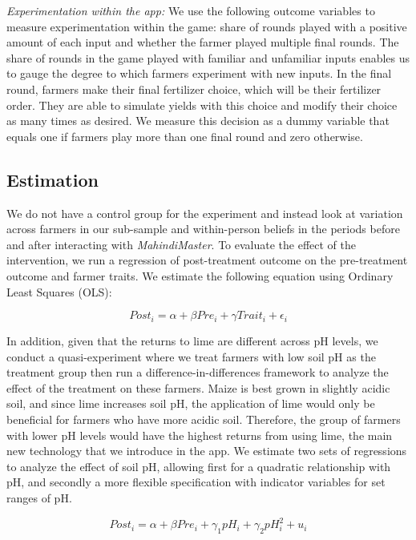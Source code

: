\documentclass[12pt,letterpaper]{article}
\begin{document}
 \textit{Experimentation within the app:} We use the following outcome variables to measure experimentation within the game: share of rounds played with a positive amount of each input and whether the farmer played multiple final rounds. The share of rounds in the game played with familiar and unfamiliar inputs enables us to gauge the degree to which farmers experiment with new inputs. In the final round, farmers make their final fertilizer choice, which will be their fertilizer order. They are able to simulate yields with this choice and modify their choice as many times as desired. We measure this decision as a dummy variable that equals one if farmers play more than one final round and zero otherwise.
 
 \subsection{Estimation}
 
 We do not have a control group for the experiment and instead look at variation across farmers in our sub-sample and within-person beliefs in the periods before and after interacting with \textit{MahindiMaster}. To evaluate the effect of the intervention, we run a regression of post-treatment outcome on the pre-treatment outcome and farmer traits. We estimate the following equation using Ordinary Least Squares (OLS):
 
 \begin{equation}
 Post_i = \alpha + \beta Pre_i + \gamma Trait_i + \epsilon_i
 \end{equation}
 
\noindent In addition, given that the returns to lime are different across pH levels, we conduct a quasi-experiment where we treat farmers with low soil pH as the treatment group then run a difference-in-differences framework to analyze the effect of the treatment on these farmers. Maize is best grown in slightly acidic soil, and since lime increases soil pH, the application of lime would only be beneficial for farmers who have more acidic soil. Therefore, the group of farmers with lower pH levels would have the highest returns from using lime, the main new technology that we introduce in the app. We estimate two sets of regressions to analyze the effect of soil pH, allowing first for a quadratic relationship with pH, and secondly a more flexible specification with indicator variables for set ranges of pH.
 
  \begin{equation}
 Post_i = \alpha + \beta Pre_i + \gamma_{1} pH_i + \gamma_{2} pH_i^2 + u_i
 \end{equation}
 
\end{document}
